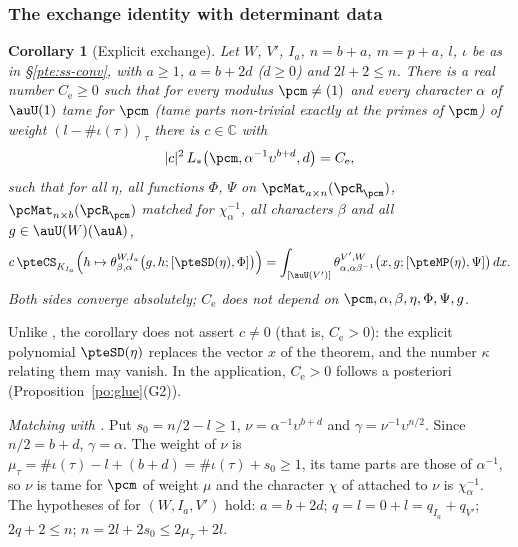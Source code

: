 \documentclass[10pt]{amsart}
\newtheorem{corollary}[theorem]{Corollary}
\theoremstyle{definition}
\theoremstyle{remark}
\newcommand{\C}{\mathbb C}
\begin{document}
\subsubsection{The exchange identity with determinant data}\label{pte:ss-explicit}

\begin{corollary}[Explicit exchange]\label{pte:explicit}
Let $W$, $V'$, $I_a$, $n=b+a$, $m=p+a$, $l$, $\iota$ be as in \S\ref{pte:ss-conv}, with $a\ge1$,
$a=b+2d$ ($d\ge0$) and $2l+2\le n$. There is a real number $C_{\mathrm e}\ge0$ such that for every
modulus $\pcm\ne(1)$ and every character $\alpha$ of $\auU(1)$ tame for $\pcm$ (tame parts
non-trivial exactly at the primes of $\pcm$) of weight $(l-\#\iota(\tau))_\tau$ there is $c\in\C$
with
\[
|c|^2\,L_*\bigl(\pcm,\alpha^{-1}\upsilon^{b+d},d\bigr)=C_{\mathrm e},
\]
such that for all $\eta$, all functions $\Phi$, $\Psi$ on $\pcMat_{a\times n}(\pcR_\pcm)$,
$\pcMat_{n\times b}(\pcR_\pcm)$ matched for $\chi_\alpha^{-1}$, all characters $\beta$ and all $g\in
\auU(W)(\auA)$,
\begin{equation}\label{pte:eq-explicit}
c\,\pteCS_{K_{I_a}}\Bigl(h\mapsto\theta^{W,I_a}_{\beta,\alpha}\bigl(g,h;[\pteSD(\eta),\Phi]\bigr)\Bigr)
=\int_{[\auU(V')]}\theta^{V',W}_{\alpha,\alpha\beta^{-1}}\bigl(x,g;[\pteMP(\eta),\Psi]\bigr)\,dx .
\end{equation}
Both sides converge absolutely; $C_{\mathrm e}$ does not depend on $\pcm,\alpha,\beta,\eta,\Phi,\Psi,g$.
\end{corollary}

Unlike {\cite[Theorem~3.2]{P53}}, the corollary does not assert $c\ne0$ (that is, $C_{\mathrm e}>0$): the
explicit polynomial $\pteSD(\eta)$ replaces the vector $x$ of the theorem, and the number $\kappa$
relating them may vanish. In the application, $C_{\mathrm e}>0$ follows a posteriori
(Proposition~\ref{po:glue}(G2)).

\emph{Matching with {\cite[Theorem~3.2]{P53}}.} Put $s_0=n/2-l\ge1$, $\nu=\alpha^{-1}\upsilon^{b+d}$ and
$\gamma=\nu^{-1}\upsilon^{n/2}$. Since $n/2=b+d$, $\gamma=\alpha$. The weight of $\nu$ is
$\mu_\tau=\#\iota(\tau)-l+(b+d)=\#\iota(\tau)+s_0\ge1$, its tame parts are those of $\alpha^{-1}$, so $\nu$ is
tame for $\pcm$ of weight $\mu$ and the character $\chi$ of {\cite[Definition~3.1]{P53}} attached
to $\nu$ is $\chi_\alpha^{-1}$. The hypotheses of {\cite[Theorem~3.2]{P53}} for $(W,I_a,V')$ hold: $a=b+2d$;
$q=l=0+l=q_{I_a}+q_{V'}$; $2q+2\le n$; $n=2l+2s_0\le2\mu_\tau+2l$.
\end{document}
